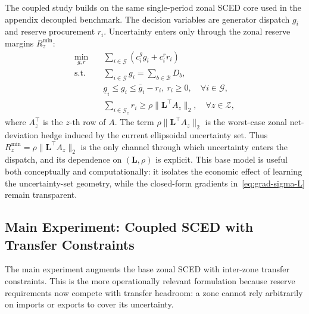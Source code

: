 \documentclass[11pt]{article}
\newcommand{\cG}{\mathcal{G}}
\newcommand{\cB}{\mathcal{B}}
\newcommand{\cZ}{\mathcal{Z}}
\newcommand{\bL}{\bm{L}}
\theoremstyle{definition}
\begin{document}
The coupled study builds on the same single-period zonal SCED core used in the appendix decoupled benchmark. The decision variables are generator dispatch $g_i$ and reserve procurement $r_i$. Uncertainty enters only through the zonal reserve margins $R_z^{\min}$:
\begin{equation}\label{eq:decoupled-sced}
\begin{aligned}
\min_{g,r}\quad & \sum_{i \in \cG}(c_i^g g_i + c_i^r r_i) \\
\text{s.t.}\quad
& \sum_{i\in\cG} g_i = \sum_{b\in\cB} D_b, \\
& \underline g_i \le g_i \le \bar g_i - r_i,\ r_i\ge 0, \quad \forall i\in\cG,\\
& \sum_{i \in \cG_z} r_i \ge \rho\|\bL^\top A_z\|_2, \quad \forall z\in\cZ,
\end{aligned}
\end{equation}
where $A_z^\top$ is the $z$-th row of $A$. The term $\rho\|\bL^\top A_z\|_2$ is the worst-case zonal net-deviation hedge induced by the current ellipsoidal uncertainty set. Thus $R_z^{\min} = \rho\|\bL^\top A_z\|_2$ is the only channel through which uncertainty enters the dispatch, and its dependence on $(\bL,\rho)$ is explicit. This base model is useful both conceptually and computationally: it isolates the economic effect of learning the uncertainty-set geometry, while the closed-form gradients in~\eqref{eq:grad-sigma-L} remain transparent.

\subsection{Main Experiment: Coupled SCED with Transfer Constraints}

The main experiment augments the base zonal SCED with inter-zone transfer constraints. This is the more operationally relevant formulation because reserve requirements now compete with transfer headroom: a zone cannot rely arbitrarily on imports or exports to cover its uncertainty.
\end{document}
